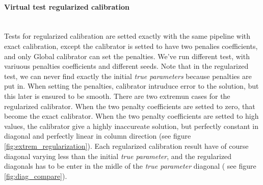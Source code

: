 \documentclass[a4paper,10pt]{article}
\begin{document}
\paragraph{Virtual test regularized calibration}\mbox{}\\
Tests for regularized calibration are setted exactly with the same pipeline with exact calibration, except the calibrator is setted to have two penalies coefficients, and only Global calibrator can set the penalties. We've run different test, with variuous penalties coefficients and different seeds. Note that in the regularized test, we can never find exactly the initial \textit{true parameters} because penalties are put in. When setting the penalties, calibrator intruduce error to the solution, but this later is ensured to be smooth. There are two extremun cases for the regularized  calibrator. When the two penalty coefficients are setted to zero, that become the exact calibrator. When the two penalty coefficients are setted to high values, the calibrator give a highly inaccureate solution, but perfectly constant in diagonal and perfectly linear in column direction (see figure \ref{fig:extrem_regularization}). Each regularized calibration result have of course diagonal varying less than the initial \textit{true parameter}, and the regularized diagonals has to be enter in the midle of the \textit{true parameter} diagonal ( see figure \ref{fig:diag_compare}).
\end{document}
